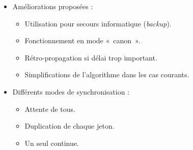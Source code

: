 \begin{frame}	
	\begin{itemize}
		\item[\textbullet] Améliorations proposées : 
			\begin{itemize}
				\item Utilisation pour secours informatique (\textit{backup}).
				\item Fonctionnement en mode «~canon~».
				\item Rétro-propagation si délai trop important.
				\item Simplifications de l'algorithme dans les cas courants.
			\end{itemize}
		\vspace{1em}
		\item[\textbullet] Différents modes de synchronisation : 
			\begin{itemize}
				\item Attente de tous.
				\item Duplication de chaque jeton.
				\item Un seul continue.
			\end{itemize}
	\end{itemize}
\end{frame}